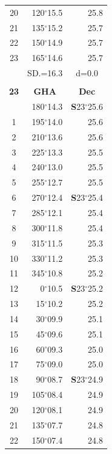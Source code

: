 \documentclass[10pt, a4paper]{report}
\begin{document}
\begin{scriptsize}
\begin{tabular*}{0.2\textwidth}[t]{@{\extracolsep{\fill}}|c|rr|}
20 & 120$^\circ$15.5 & 25.8\\
21 & 135$^\circ$15.2 & \raisebox{0.24ex}{\boldmath$\cdot$~\boldmath$\cdot$~~}25.7\\
22 & 150$^\circ$14.9 & 25.7\\
23 & 165$^\circ$14.6 & 25.7\\
\hline
\rule{0pt}{2.4ex} & \multicolumn{1}{c}{SD.=16.3} & \multicolumn{1}{c|}{d=0.0}\\
\hline
\multicolumn{1}{c}{}\\[-0.5ex]\hline
\multicolumn{1}{|c|}{\rule{0pt}{2.6ex}\textbf{23}} & \multicolumn{1}{c}{\textbf{GHA}} & \multicolumn{1}{c|}{\textbf{Dec}}\\
\hline\rule{0pt}{2.6ex}\noindent
0 & 180$^\circ$14.3 & \textbf{S}23$^\circ$25.6\\
1 & 195$^\circ$14.0 & 25.6\\
2 & 210$^\circ$13.6 & 25.6\\
3 & 225$^\circ$13.3 & \raisebox{0.24ex}{\boldmath$\cdot$~\boldmath$\cdot$~~}25.5\\
4 & 240$^\circ$13.0 & 25.5\\
5 & 255$^\circ$12.7 & 25.5\\[2Pt]
6 & 270$^\circ$12.4 & \textbf{S}23$^\circ$25.4\\
7 & 285$^\circ$12.1 & 25.4\\
8 & 300$^\circ$11.8 & 25.4\\
9 & 315$^\circ$11.5 & \raisebox{0.24ex}{\boldmath$\cdot$~\boldmath$\cdot$~~}25.3\\
10 & 330$^\circ$11.2 & 25.3\\
11 & 345$^\circ$10.8 & 25.2\\[2Pt]
12 & 0$^\circ$10.5 & \textbf{S}23$^\circ$25.2\\
13 & 15$^\circ$10.2 & 25.2\\
14 & 30$^\circ$09.9 & 25.1\\
15 & 45$^\circ$09.6 & \raisebox{0.24ex}{\boldmath$\cdot$~\boldmath$\cdot$~~}25.1\\
16 & 60$^\circ$09.3 & 25.0\\
17 & 75$^\circ$09.0 & 25.0\\[2Pt]
18 & 90$^\circ$08.7 & \textbf{S}23$^\circ$24.9\\
19 & 105$^\circ$08.4 & 24.9\\
20 & 120$^\circ$08.1 & 24.9\\
21 & 135$^\circ$07.7 & \raisebox{0.24ex}{\boldmath$\cdot$~\boldmath$\cdot$~~}24.8\\
22 & 150$^\circ$07.4 & 24.8\\

\end{tabular*}
\end{scriptsize}
\end{document}
